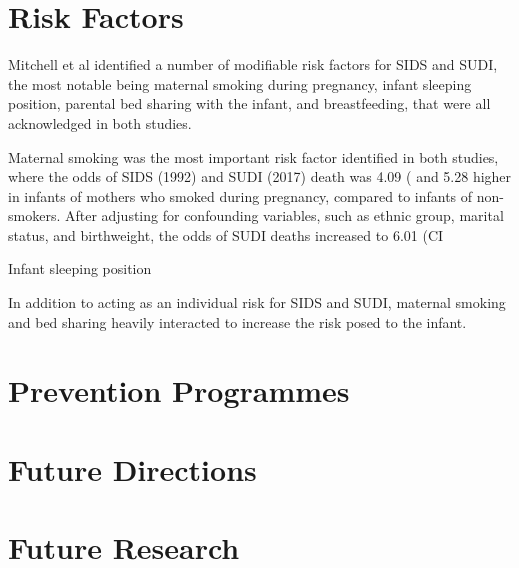 \documentclass[11pt]{article}
\begin{document}
\section{Risk Factors}

Mitchell et al \autocite{Mitchellcombinationbedsharing2017,MitchellFourmodifiableother1992} identified a number of modifiable risk factors for SIDS and SUDI, the most notable being maternal smoking during pregnancy, infant sleeping position, parental bed sharing with the infant, and breastfeeding, that were all acknowledged in both studies. 

Maternal smoking was the most important risk factor identified in both studies, where the odds of SIDS (1992) and SUDI (2017) death was 4.09 ( and 5.28 higher in infants of mothers who smoked during pregnancy, compared to infants of non-smokers. 
After adjusting for confounding variables, such as ethnic group, marital status, and birthweight, the odds of SUDI deaths increased to 6.01 (CI

Infant sleeping position

In addition to acting as an individual risk for SIDS and SUDI, maternal smoking and bed sharing heavily interacted to increase the risk posed to the infant. 


\section{Prevention Programmes}

\section{Future Directions}

\section{Future Research}

\printbibliography
\end{document}

